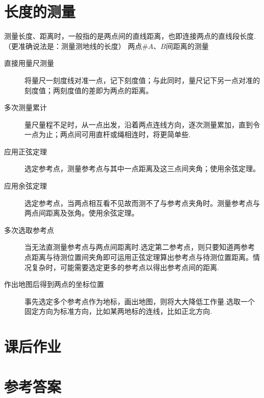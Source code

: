     \section{长度的测量}
      测量长度、距离时，一般指的是两点间的直线距离，也即连接两点的直线段长度.（更准确说法是：测量测地线的长度）
      两点#$A$、$B$间距离的测量
      \begin{description}
        \item[直接用量尺测量]
          将量尺一刻度线对准一点，记下刻度值；与此同时，量尺记下另一点对准的刻度值；两刻度值的差即为两点的距离。
        \item[多次测量累计]
          量尺量程不足时，从一点出发，沿着两点连线方向，逐次测量累加，直到令一点为止；两点间可用直杆或绳相连时，将更简单些.
        \item[应用正弦定理]选定参考点，测量参考点与其中一点距离及这三点间夹角；使用余弦定理。
        \item[应用余弦定理]选定参考点，当两点相互看不见故而测不了与参考点夹角时。测量参考点与两点间距离及张角。使用余弦定理。
        \item[多次选取参考点]当无法直测量参考点与两点间距离时.选定第二参考点，则只要知道两参考点距离与待测位置间夹角即可运用正弦定理算出参考点与待测位置距离。情况复杂时，可能需要选定更多的参考点以得出参考点间的距离.
        \item[作出地图后得到两点的坐标位置]事先选定多个参考点作为地标，画出地图，则将大大降低工作量.选取一个固定方向为标准方向，比如某两地标的连线，比如正北方向.
      \end{description}


      \begin{exercise}
        \item
      \end{exercise}

\newpage
\section{课后作业}
  \begin{exercise}

  \end{exercise}
\stopexercise

\newpage
\section{参考答案}
\begin{multicols}{2}
  \printanswer
\end{multicols}
